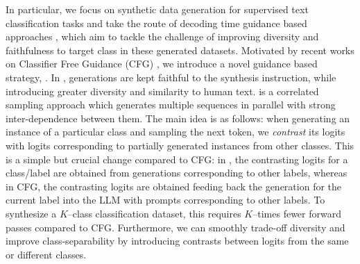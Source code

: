 In particular, we focus on synthetic data generation for supervised text classification tasks and take the route of decoding time guidance based approaches \citep{sanchez2023stay,o2023contrastive,li2023contrastive,chuang2023dola}, which aim to tackle the challenge of improving diversity and faithfulness to target class in these generated datasets. Motivated by recent works on Classifier Free Guidance (CFG) \citep{sanchez2023stay}, we introduce a novel guidance based strategy, \corrsyn.
In \corrsyn{}, generations are kept faithful to the synthesis instruction, while introducing greater diversity and similarity to human text. \corrsyn{} is a correlated sampling approach which generates multiple sequences in parallel with strong inter-dependence between them. 
The main idea is as follows: when generating an instance of a particular class and sampling the next token, we \emph{contrast} its logits with logits corresponding to partially generated instances from other classes.
This is a simple but crucial change compared to CFG: in \corrsyn, the contrasting logits for a class/label are obtained from generations corresponding to other labels, whereas in CFG, the contrasting logits are obtained feeding back the generation for the current label into the LLM with prompts corresponding to other labels. To synthesize a $K$--class classification dataset, this requires $K$--times fewer forward passes compared to CFG. Furthermore, we can smoothly trade-off diversity and improve class-separability by introducing contrasts between logits from the same or different classes. 



